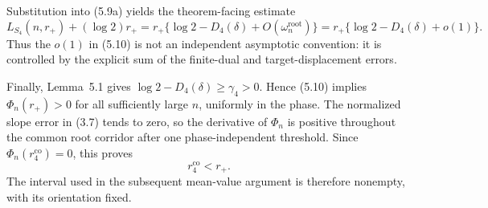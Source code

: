 Substitution into (5.9a) yields the theorem-facing estimate
\begin{equation*}
  L_{S_4}(n,r_+)+(\log 2)r_+
  =r_+\{\log 2-D_4(\delta)+O(\omega_n^{\mathrm{root}})\}
  =r_+\{\log 2-D_4(\delta)+o(1)\}.
  \tag{5.10}
\end{equation*}
Thus the $o(1)$ in (5.10) is not an independent asymptotic convention: it is
controlled by the explicit sum of the finite-dual and target-displacement
errors.

Finally, Lemma~5.1 gives
$\log 2-D_4(\delta)\ge\gamma_4>0$. Hence (5.10) implies
$\Phi_n(r_+)>0$ for all sufficiently large $n$, uniformly in the phase. The
normalized slope error in (3.7) tends to zero, so the derivative of $\Phi_n$
is positive throughout the common root corridor after one phase-independent
threshold. Since $\Phi_n(r_4^{\mathrm{co}})=0$, this proves
\[
  r_4^{\mathrm{co}}<r_+.
\]
The interval used in the subsequent mean-value argument is therefore
nonempty, with its orientation fixed.
